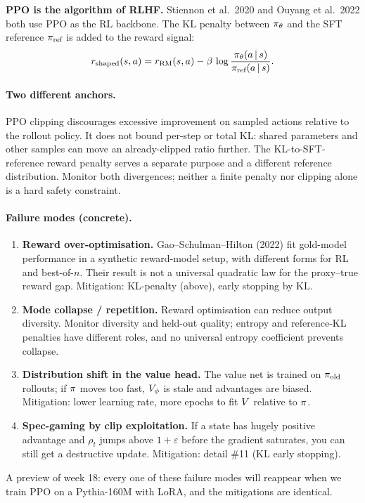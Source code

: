 \documentclass[11pt,oneside]{scrbook}
\begin{document}
\begin{safetyangle}
\textbf{PPO is the algorithm of RLHF.} Stiennon et al.\ 2020 and Ouyang et al.\ 2022 both use PPO as the RL backbone. The KL penalty between $\pi_\theta$ and the SFT reference $\pi_\text{ref}$ is added to the reward signal:
\[
  r_\text{shaped}(s, a) = r_\text{RM}(s, a) - \beta\, \log \frac{\pi_\theta(a\,\vert\, s)}{\pi_\text{ref}(a\,\vert\, s)}.
\]

\paragraph{Two different anchors.} PPO clipping discourages excessive improvement on sampled actions relative to the rollout policy. It does not bound per-step or total KL: shared parameters and other samples can move an already-clipped ratio further. The KL-to-SFT-reference reward penalty serves a separate purpose and a different reference distribution. Monitor both divergences; neither a finite penalty nor clipping alone is a hard safety constraint.

\paragraph{Failure modes (concrete).}
\begin{enumerate}[leftmargin=*]
  \item \textbf{Reward over-optimisation.} Gao--Schulman--Hilton (2022) fit gold-model performance in a synthetic
reward-model setup, with different forms for RL and best-of-$n$. Their
result is not a universal quadratic law for the proxy--true reward gap. Mitigation: KL-penalty (above), early stopping by KL.
  \item \textbf{Mode collapse / repetition.} Reward optimisation can reduce output diversity. Monitor diversity and
held-out quality; entropy and reference-KL penalties have different roles,
and no universal entropy coefficient prevents collapse.
  \item \textbf{Distribution shift in the value head.} The value net is trained on $\pi_\text{old}$ rollouts; if $\pi$ moves too fast, $V_\phi$ is stale and advantages are biased. Mitigation: lower learning rate, more epochs to fit $V$ relative to $\pi$.
  \item \textbf{Spec-gaming by clip exploitation.} If a state has hugely positive advantage and $\rho_t$ jumps above $1+\varepsilon$ before the gradient saturates, you can still get a destructive update. Mitigation: detail \#11 (KL early stopping).
\end{enumerate}

A preview of week 18: every one of these failure modes will reappear when we train PPO on a Pythia-160M with LoRA, and the mitigations are identical.
\end{safetyangle}
\end{document}
